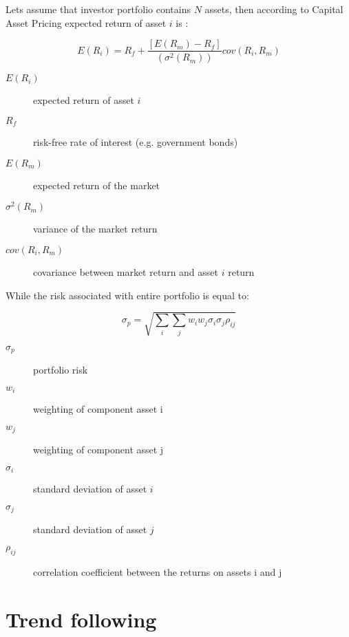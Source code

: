 Lets assume that investor portfolio contains $N$ assets, then according to Capital Asset Pricing expected return of asset $i$ is \cite{CAPM}: 

\begin{equation}
\label{first_eq}
 E(R_{i})  = R_{f} + \frac{ [E(R_{m}) - R_{f}]} {(\sigma^2(R_{m}))} cov(R_{i}, R_{m})
\end{equation} 

\begin{description}
  \item [$E(R_{i})$]
    expected return of asset $i$
  \item [$R_{f}$]
    risk-free rate of interest (e.g. government bonds)
  \item [$E(R_{m})$]
    expected return of the market
  \item [$\sigma^2(R_{m})$]
    variance of the market return
  \item [$cov(R_{i}, R_{m})$]
    covariance between market return and asset $i$ return
\end{description}

While the risk associated with entire portfolio is equal to:

\begin{equation}
\label{sec_eq}
 \sigma_{p}  = \sqrt{\sum_{i} \sum_{j} w_{i}w_{j} \sigma_{i} \sigma_{j} \rho_{ij}}
\end{equation} 

\begin{description}
  \item [$\sigma_{p}$]
    portfolio risk
  \item [$w_{i}$]
    weighting of component asset i
  \item [$w_{j}$]
    weighting of component asset j
  \item [$\sigma_{i}$]
    standard deviation of asset $i$
  \item [$\sigma_{j}$]
    standard deviation of asset $j$
  \item [$\rho_{ij}$]
    correlation coefficient between the returns on assets i and j
\end{description}
 



\section{Trend following}
\label{sec:trendFollowing}

